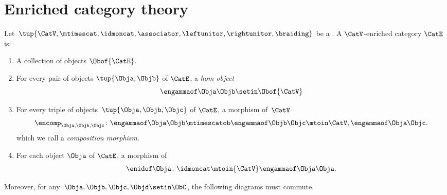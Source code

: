 
\section{Enriched category theory}
\label{sec:enrichment-enriched-categories}

\begin{ctdefinition}
    \label{def:enrichment-structure}
    Let~$\tup{\CatV, \mtimescat, \idmoncat, \associator, \leftunitor, \rightunitor, \braiding}$ be a .
    A $\CatV$-enriched category $\CatE$ is:
    
    \constit
    \begin{enumerate}
    \item A collection of objects $\Obof{\CatE}$.
    \item For every pair of objects $\tup{\Obja, \Objb}$ of $\CatE$, a \emph{hom-object}
             \begin{equation}
                  \engammaof\Obja\Objb \setin \Obof{\CatV}
              \end{equation}
        \item For every triple of objects~$\tup{\Obja, \Objb, \Objc}$ of $\CatE$, a morphism of~$\CatV$
              \begin{equation}
                  \encomp_{\Obja,\Objb,\Objc}\colon \engammaof\Obja\Objb \mtimescatob \engammaof\Objb\Objc \mtoin\CatV, \engammaof\Obja\Objc.
              \end{equation}
             which we call a \emph{composition morphism}.
        \item For each object $\Obja$ of $\CatE$, a morphism of~\CatV
              \begin{equation}
                  \enidof\Obja \colon \idmoncat \mtoin{\CatV} \engammaof\Obja\Obja.
              \end{equation}
               \end{enumerate}
               
               \condit
             
              Moreover, for any~$\Obja,\Objb,\Objc,\Objd\setin \ObC$, the following diagrams must commute.
\end{ctdefinition}


